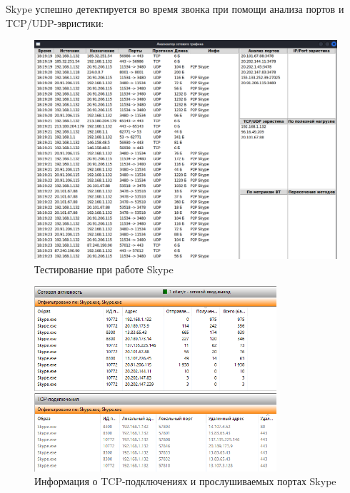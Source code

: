 \documentclass[bachelor, och, coursework]{SCWorks}
\begin{document}
Skype успешно детектируется во время звонка при помощи анализа портов и TCP/UDP-эвристики:
\begin{figure}[H]
    \centering
    \includegraphics[width=1\textwidth]{test5.png}
    \caption{Тестирование при работе Skype}
\end{figure}

\begin{figure}[H]
    \centering
    \includegraphics[width=0.8\textwidth]{test5_resmon.png}
    \caption{Информация о TCP-подключениях и прослушиваемых портах Skype}
    \label{test5_resmon}
\end{figure}
\end{document}
